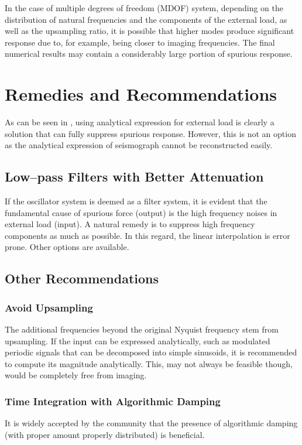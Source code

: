 In the case of multiple degrees of freedom (MDOF) system, depending on the distribution of natural frequencies and the components of the external load, as well as the upsampling ratio, it is possible that higher modes produce significant response due to, for example, being closer to imaging frequencies. The final numerical results may contain a considerably large portion of spurious response.
\section{Remedies and Recommendations}
As can be seen in , using analytical expression for external load is clearly a solution that can fully suppress spurious response. However, this is not an option as the analytical expression of seismograph cannot be reconstructed easily.
\subsection{Low--pass Filters with Better Attenuation}
If the oscillator system is deemed as a filter system, it is evident that the fundamental cause of spurious force (output) is the high frequency noises in external load (input). A natural remedy is to suppress high frequency components as much as possible. In this regard, the linear interpolation is error prone. Other options are available.
\subsection{Other Recommendations}
\subsubsection{Avoid Upsampling}
The additional frequencies beyond the original Nyquist frequency stem from upsampling. If the input can be expressed analytically, such as modulated periodic signals that can be decomposed into simple sinusoids, it is recommended to compute its magnitude analytically. This, may not always be feasible though, would be completely free from imaging.
\subsubsection{Time Integration with Algorithmic Damping}
It is widely accepted by the community that the presence of algorithmic damping (with proper amount properly distributed) is beneficial.

